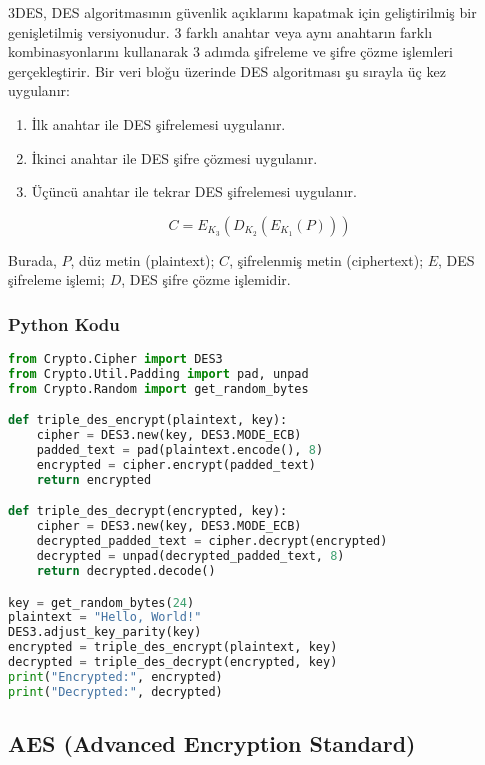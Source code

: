 3DES, DES algoritmasının güvenlik açıklarını kapatmak için geliştirilmiş bir genişletilmiş versiyonudur. 3 farklı anahtar veya aynı anahtarın farklı kombinasyonlarını kullanarak 3 adımda şifreleme ve şifre çözme işlemleri gerçekleştirir. Bir veri bloğu üzerinde DES algoritması şu sırayla üç kez uygulanır:

\begin{enumerate}
    \item İlk anahtar ile DES şifrelemesi uygulanır.
    \item İkinci anahtar ile DES şifre çözmesi uygulanır.
    \item Üçüncü anahtar ile tekrar DES şifrelemesi uygulanır.
\end{enumerate}

\[ C = E_{K_3}(D_{K_2}(E_{K_1}(P)))\]

Burada, $P$, düz metin (plaintext); $C$, şifrelenmiş metin (ciphertext); $E$, DES şifreleme işlemi; $D$, DES şifre çözme işlemidir.

\subsubsection{Python Kodu}

\begin{lstlisting}[language=Python]
from Crypto.Cipher import DES3
from Crypto.Util.Padding import pad, unpad
from Crypto.Random import get_random_bytes

def triple_des_encrypt(plaintext, key):
    cipher = DES3.new(key, DES3.MODE_ECB)
    padded_text = pad(plaintext.encode(), 8)
    encrypted = cipher.encrypt(padded_text)
    return encrypted

def triple_des_decrypt(encrypted, key):
    cipher = DES3.new(key, DES3.MODE_ECB)
    decrypted_padded_text = cipher.decrypt(encrypted)
    decrypted = unpad(decrypted_padded_text, 8)
    return decrypted.decode()

key = get_random_bytes(24)
plaintext = "Hello, World!"
DES3.adjust_key_parity(key)
encrypted = triple_des_encrypt(plaintext, key)
decrypted = triple_des_decrypt(encrypted, key)
print("Encrypted:", encrypted)
print("Decrypted:", decrypted)
\end{lstlisting}

\newpage

\subsection{AES (Advanced Encryption Standard)}

